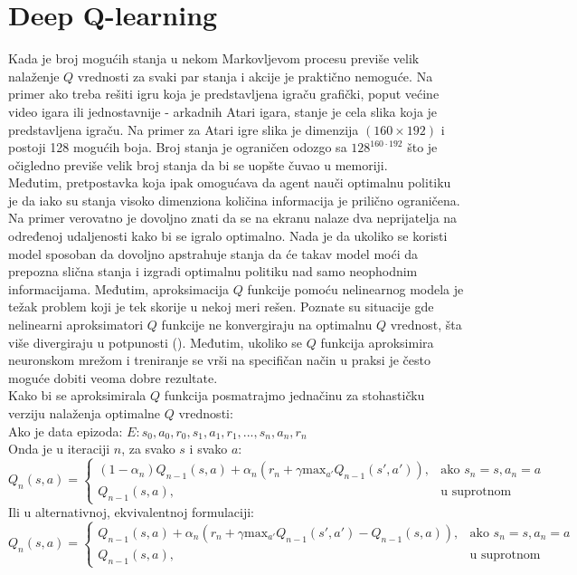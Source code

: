 \documentclass[a4paper,fleqn,12pt]{JMThesis}
\theoremstyle{plain}
\theoremstyle{definition}
\theoremstyle{definition}
\begin{document}
\section{Deep Q-learning}
Kada je broj mogućih stanja u nekom Markovljevom procesu previše velik nalaženje $Q$ vrednosti za svaki par stanja i akcije je praktično
nemoguće. Na primer ako treba rešiti igru koja je predstavljena igraču grafički, poput većine video igara ili jednostavnije -
arkadnih Atari igara, stanje je cela slika koja je predstavljena igraču. Na primer za Atari igre slika je dimenzija $(160 \times 192)$
i postoji 128 mogućih boja. Broj stanja je ograničen odozgo sa $128^{160\cdot 192}$ što je očigledno previše velik broj stanja da bi
se uopšte čuvao u memoriji.\\
Međutim, pretpostavka koja ipak omogućava da agent nauči optimalnu politiku je da iako su stanja visoko dimenziona količina informacija je
prilično ograničena. Na primer verovatno je dovoljno znati da se na ekranu nalaze dva neprijatelja na određenoj udaljenosti kako bi
se igralo optimalno. Nada je da ukoliko se koristi model sposoban da dovoljno apstrahuje stanja da će takav model moći da
prepozna slična stanja i izgradi optimalnu politiku nad samo neophodnim informacijama. Međutim, aproksimacija $Q$ funkcije pomoću
nelinearnog modela je težak problem koji je tek skorije u nekoj meri rešen. Poznate su situacije gde nelinearni aproksimatori
$Q$ funkcije ne konvergiraju na optimalnu $Q$ vrednost, šta više divergiraju u potpunosti (\cite{NEURIPS2018_5fd0245f}). 
Međutim, ukoliko se $Q$ funkcija aproksimira neuronskom mrežom i treniranje se vrši na specifičan način u praksi je često moguće dobiti
veoma dobre rezultate.\\
Kako bi se aproksimirala $Q$ funkcija posmatrajmo jednačinu za stohastičku verziju nalaženja optimalne $Q$ vrednosti:\\
Ako je data epizoda: $E: s_0,a_0,r_0,s_1,a_1,r_1,...,s_n,a_n,r_n$\\
Onda je u iteraciji $n$, za svako $s$ i svako $a$:\\
\[ 
	Q_n(s,a) =
	\begin{cases}
		(1-\alpha_n)Q_{n-1}(s,a) + \alpha_n (r_n + \gamma \text{max}_{a'}Q_{n-1}(s',a')), & \text{ako } s_n = s, a_n = a\\
		Q_{n-1}(s,a), & \text{u suprotnom}
	\end{cases}
\]
Ili u alternativnoj, ekvivalentnoj formulaciji:
\[ 
	Q_n(s,a) =
	\begin{cases}
		Q_{n-1}(s,a) + \alpha_n (r_n + \gamma \text{max}_{a'}Q_{n-1}(s',a') - Q_{n-1}(s,a)), & \text{ako } s_n = s, a_n = a\\
		Q_{n-1}(s,a), & \text{u suprotnom}
	\end{cases}
\]
\end{document}
